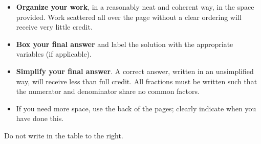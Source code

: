 \documentclass[11pt]{exam}
\begin{document}
\begin{minipage}[t]{3.7in}
\vspace{0pt}
\begin{itemize}

\item \textbf{Organize your work}, in a reasonably neat and coherent way, in
the space provided. Work scattered all over the page without a clear ordering will 
receive very little credit.  

\item \textbf{Box your final answer} and label the solution with the appropriate variables (if applicable).

\item \textbf{Simplify your final answer}. A correct answer, written in an unsimplified way, will receive less than full credit. All fractions must be written such that the numerator and denominator share no common factors.

\item If you need more space, use the back of the pages; clearly indicate when you have done this.
\end{itemize}

Do not write in the table to the right.
\end{minipage}
\hfill
\begin{minipage}[t]{2.3in}
\vspace{0pt}
\addpoints %
\gradetable[v]%

\end{minipage}
\newpage %

%
%
%
\end{document}
